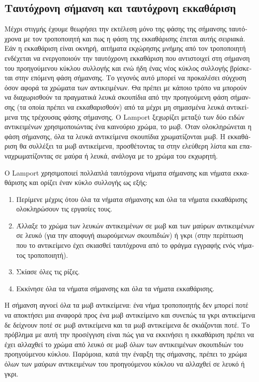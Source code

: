 \begin{greek}
\subsection{Ταυτόχρονη σήμανση και ταυτόχρονη εκκαθάριση}
Μέχρι στιγμής έχουμε θεωρήσει την εκτέλεση μόνο της φάσης
της σήμανσης ταυτόχρονα με τον τροποποιητή και πως η φάση
της εκκαθάρισης έπεται αυτής σειριακά. Εάν η εκκαθάριση
είναι οκνηρή, αιτήματα εκχώρησης μνήμης από τον τροποποιητή
ενδέχεται να ενεργοποιούν την ταυτόχρονη εκκαθάριση που
αντιστοιχεί στη σήμανση του προηγούμενου κύκλου συλλογής
και ενώ ήδη ένας νέος κύκλος συλλογής βρίσκεται στην επόμενη
φάση σήμανσης. Το γεγονός αυτό μπορεί να προκαλέσει σύγχυση
όσον αφορά τα χρώματα των αντικειμένων. Θα πρέπει με κάποιο
τρόπο να μπορούν να διαχωρισθούν τα πραγματικά λευκά
σκουπίδια από την προηγούμενη φάση σήμανσης (τα οποία πρέπει
να εκκαθαρισθούν) από τα μέχρι μη σημασμένα λευκά αντικείμενα
της τρέχουσας φάσης σήμανσης. Ο Lamport \cite{lamport1976garbage}
ξεχωρίζει μεταξύ των δύο ειδών αντικειμένων χρησιμοποιώντας
ένα καινούριο χρώμα, το μωβ. Όταν ολοκληρώνεται η φάση σήμανσης,
όλα τα λευκά αντικείμενα σκουπίδια χρωματίζονται μωβ. Η
εκκαθάριση θα συλλέξει τα μωβ αντικείμενα, προσθέτοντας
τα στην ελεύθερη λίστα και επαναχρωματίζοντας σε μαύρα
ή λευκά, ανάλογα με το χρώμα του εκχωρητή.

Ο Lamport χρησιμοποιεί πολλαπλά ταυτόχρονα νήματα σήμανσης και νήματα
εκκαθάρισης και ορίζει έναν κύκλο συλλογής ως εξής:

\begin{enumerate}
  \item Περίμενε μέχρις ότου όλα τα νήματα σήμανσης και όλα τα νήματα
        εκκαθάρισης ολοκληρώσουν τις εργασίες τους.
  \item Άλλαξε το χρώμα των λευκών αντικειμένων σε μωβ και των μαύρων
        αντικειμένων σε λευκό (για την αποφυγή αιωρούμενων σκουπιδιών)
        ή γκρι (στην περίπτωση που το αντικείμενο έχει σκιασθεί ταυτόχρονα
        από το φράγμα εγγραφής ενός νήματος τροποποιητή).
  \item Σκίασε όλες τις ρίζες.
  \item Εκκίνησε όλα τα νήματα σήμανσης και όλα τα νήματα εκκαθάρισης.
\end{enumerate}

Η σήμανση αγνοεί όλα τα μωβ αντικείμενα: ένα νήμα τροποποιητής δεν μπορεί
ποτέ να αποκτήσει μια αναφορά προς ένα μωβ αντικείμενο και συνεπώς τα
γκρι αντικείμενα δε δείχνουν ποτέ σε μωβ αντικείμενα και τα μωβ αντικείμενα
δε σκιάζονται ποτέ. Το πρόβλημα με αυτή την προσέγγιση είναι πώς 
για να εκκινήσει η εκκαθάριση πρέπει να έχει αλλαχθεί το χρώμα από
λευκό σε μωβ όλων των αντικειμένων σκουπιδιών του προηγούμενου κύκλου.
Παρόμοια, κατά την έναρξη της σήμανσης, πρέπει το χρώμα όλων των
μαύρων αντικειμένων του προηγούμενου κύκλου να αλλαχθεί σε λευκό
ή γκρι.


\end{greek}
